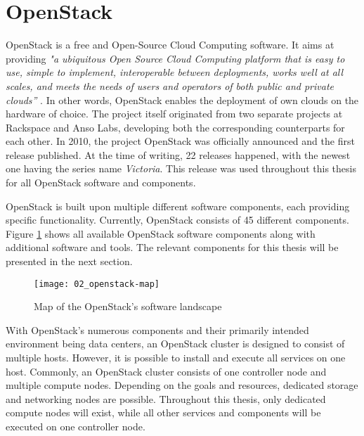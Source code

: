    
    \section{OpenStack}
    \label{section:openstack}
        
        OpenStack is a free and Open-Source Cloud Computing software.
        It aims at providing \textsl{"a ubiquitous Open Source Cloud Computing platform that is easy to use, simple to implement, interoperable between deployments, works well at all scales, and meets the needs of users and operators of both public and private clouds”} \cite{OpenStackH2018}.
        In other words, OpenStack enables the deployment of own clouds on the hardware of choice. 
        The project itself originated from two separate projects at Rackspace and Anso Labs, developing both the corresponding counterparts for each other.
        In 2010, the project OpenStack was officially announced and the first release published.
        At the time of writing, 22 releases happened, with the newest one having the series name \textsl{Victoria}.
        This release was used throughout this thesis for all OpenStack software and components.
        
        \noindent OpenStack is built upon multiple different software components, each providing specific functionality.
        Currently, OpenStack consists of 45 different components.
        Figure \ref{figure:openstack_map} shows all available OpenStack software components along with additional software and tools.
        The relevant components for this thesis will be presented in the next section.
        
        \begin{figure}[ht]
            \begin{center} 
                \texttt{[image: 02\_openstack-map]} 
                \caption[Map of OpenStack's software landscape]{Map of the OpenStack's software landscape \cite{OpenStackL2020}}
                \label{figure:openstack_map}
            \end{center}	
         \end{figure}
         
        \noindent With OpenStack's numerous components and their primarily intended environment being data centers, an OpenStack cluster is designed to consist of multiple hosts.
        However, it is possible to install and execute all services on one host.
        Commonly, an OpenStack cluster consists of one controller node and multiple compute nodes.
        Depending on the goals and resources, dedicated storage and networking nodes are possible.
        Throughout this thesis, only dedicated compute nodes will exist, while all other services and components will be executed on one controller node.


